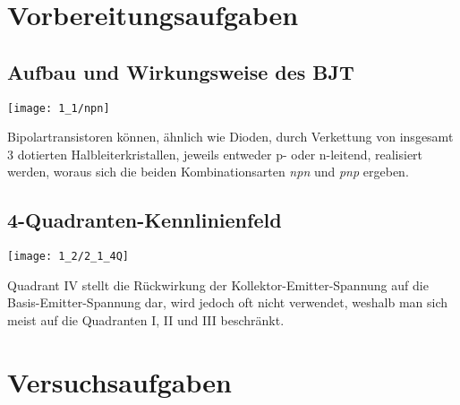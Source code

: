 \documentclass[a4paper, 12pt]{article}
\begin{document}
  
  \clearpage
  \setcounter{page}{1}

\section{Vorbereitungsaufgaben}


\subsection{Aufbau und Wirkungsweise des BJT}

\begin{center}
  \texttt{[image: 1\_1/npn]}
\end{center}

Bipolartransistoren können, ähnlich wie Dioden, durch Verkettung von insgesamt 3
dotierten Halbleiterkristallen, jeweils entweder p- oder
n-leitend, realisiert werden, woraus sich die beiden Kombinationsarten
\textit{npn} und \textit{pnp} ergeben.

\subsection{4-Quadranten-Kennlinienfeld}

\begin{center}
  \texttt{[image: 1\_2/2\_1\_4Q]}
\end{center}


\noindent Quadrant IV stellt die Rückwirkung der Kollektor-Emitter-Spannung auf
die Basis-Emitter-Spannung dar, wird jedoch oft nicht verwendet, weshalb man
sich meist auf die Quadranten I, II und III beschränkt.


\pagebreak

  \clearpage
\setcounter{page}{1}

\setcounter{section}{0}
\section{Versuchsaufgaben}
\end{document}
